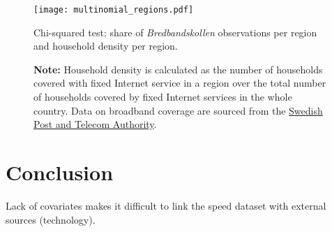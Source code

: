 \documentclass[12pt]{article}
\begin{document}
\vspace{2cm}
\begin{figure}[H]
    \centering
        \texttt{[image: multinomial\_regions.pdf]}
        \caption{Chi-squared test: share of \textit{Bredbandskollen} observations per region and household density per region.}
        \label{fig:a17}
        \caption*{\textbf{Note:} Household density is calculated as the number of households covered with fixed Internet service in a region over the total number of households covered by fixed Internet services in the whole country. Data on broadband coverage are sourced from the \href{http://statistik.pts.se/broadband/}{Swedish Post and Telecom Authority}.}
\end{figure}   

       

\section{Conclusion}
Lack of covariates makes it difficult to link the speed dataset with external sources (technology).




\end{document}
